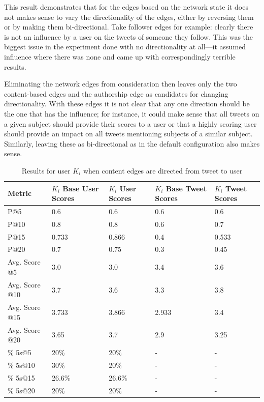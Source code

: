 This result demonstrates that for the edges based on the network state it does not makes sense to vary the directionality of the edges, either by reversing them or by making them bi-directional. Take follower edges for example: clearly there is not an influence by a user on the tweets of someone they follow. This was the biggest issue in the experiment done with no directionality at all---it assumed influence where there was none and came up with correspondingly terrible results.

Eliminating the network edges from consideration then leaves only the two content-based edges and the authorship edge as candidates for changing directionality. With these edges it is not clear that any one direction should be the one that has the influence; for instance, it could make sense that all tweets on a given subject should provide their scores to a user or that a highly scoring user should provide an impact on all tweets mentioning subjects of a similar subject. Similarly, leaving these as bi-directional as in the default configuration also makes sense.


\begin{table}
\centering
\begin{tabular}{l|p{2.2cm}|p{2.2cm}|p{2.2cm}|p{2.2cm}}
{\bf Metric} & {\bf $K_{i}$ Base User Scores} & {\bf $K_{i}$ User Scores} & {\bf $K_{i}$ Base Tweet Scores} & {\bf $K_{i}$ Tweet Scores} \\ \hline
P@5   & 0.6 & 0.6 & 0.6 & 0.6 \\ \hline
P@10 & 0.8 & 0.8 & 0.6 & 0.7 \\ \hline
P@15 & 0.733 & 0.866 & 0.4 & 0.533 \\ \hline
P@20 & 0.7 & 0.75 & 0.3 & 0.45 \\ \hline

Avg. Score @5   & 3.0 & 3.0 & 3.4 & 3.6 \\ \hline
Avg. Score @10 & 3.7 & 3.6 & 3.3 & 3.8 \\ \hline
Avg. Score @15 & 3.733 & 3.866 & 2.933 & 3.4 \\ \hline
Avg. Score @20 & 3.65 & 3.7 & 2.9 & 3.25 \\ \hline

\% 5s@5    & 20\% & 20\% & - & - \\ \hline
\% 5s@10  & 30\% & 20\% & - & - \\ \hline
\% 5s@15  & 26.6\% & 26.6\% & - & - \\ \hline
\% 5s@20  & 20\% & 20\% & - & - \\

\end{tabular}
\caption{Results for user $K_{i}$ when content edges are directed from tweet to user}
\label{tab:ContentTweetToUser}
\end{table}


